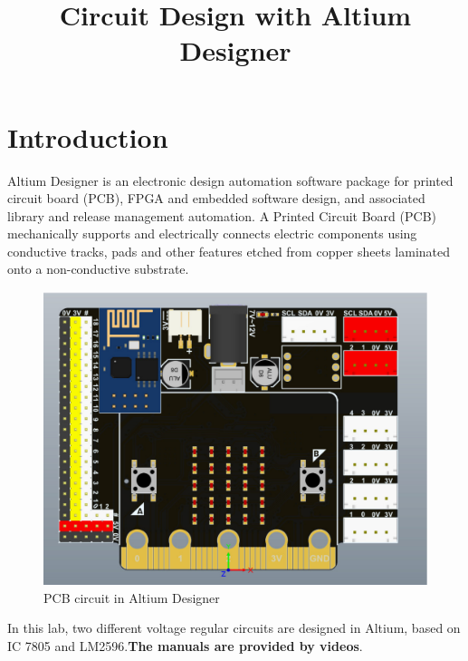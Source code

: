 \documentclass[twoside, final]{hcmut_report}
\title{Circuit Design with Altium Designer}
\begin{document}
\coverpage
\pagestyle{empty}
\tableofcontents
\pagestyle{fancy}
\newpage
\section{Introduction}
Altium Designer is an electronic design automation software package for printed circuit
board (PCB), FPGA and embedded software design, and associated library and release
management automation. A Printed Circuit Board (PCB) mechanically supports and electrically connects electric components using conductive tracks, pads and other features
etched from copper sheets laminated onto a non-conductive substrate.

\begin{figure}[ht]
    \centering
    \includegraphics[scale=0.3]{graphics/intro.png}
    \caption{PCB circuit in Altium Designer}
\end{figure}

In this lab, two different voltage regular circuits are designed in Altium, based on IC 7805
and LM2596.\textbf{The manuals are provided by videos}.

\pagebreak


\pagebreak
\end{document}
